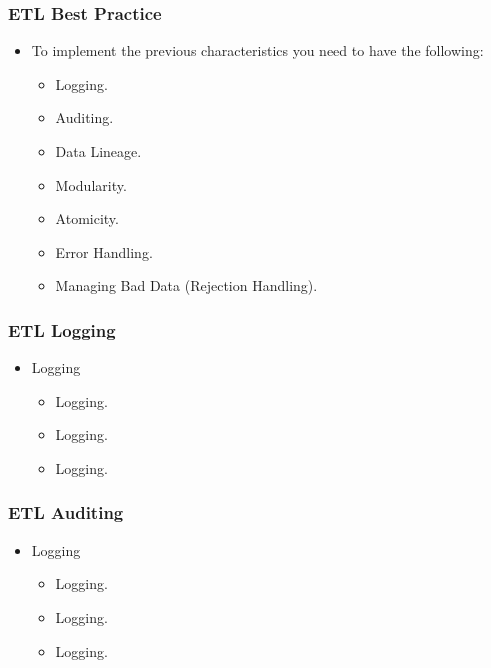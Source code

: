 \begin{frame}
\frametitle{ETL Best Practice}
\begin{itemize}[<+->]
	\item To implement the previous characteristics you need to have the following:
	\begin{itemize}[<+->]
		\item [\faCheckSquareO] Logging.
		
		\item [\faCheckSquareO] Auditing.
		
		\item [\faCheckSquareO] Data Lineage.
		
		\item [\faCheckSquareO] Modularity.
		
		\item [\faCheckSquareO] Atomicity.
		
		\item [\faCheckSquareO] Error Handling.
		
		\item [\faCheckSquareO] Managing Bad Data (Rejection Handling).		
	\end{itemize}
\end{itemize}
\end{frame}


\begin{frame}
\frametitle{ETL Logging}
\begin{itemize}[<+->]
	\item Logging
	\begin{itemize}[<+->]
		\item  Logging.
		\item  Logging.
		\item  Logging.
		

	\end{itemize}
\end{itemize}
\end{frame}


\begin{frame}
\frametitle{ETL Auditing}
\begin{itemize}[<+->]
	\item Logging
	\begin{itemize}[<+->]
		\item  Logging.
		\item  Logging.
		\item  Logging.
		
		
	\end{itemize}
\end{itemize}
\end{frame}

